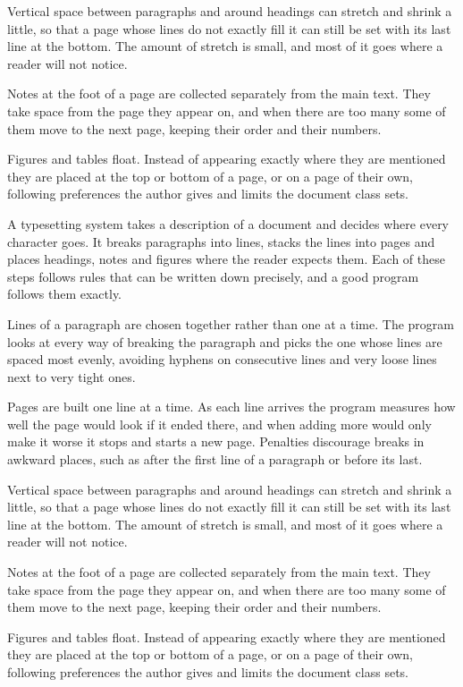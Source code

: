 \documentclass{article}
\begin{document}
Vertical space between paragraphs and around headings can stretch and shrink a little, so that a page whose lines do not exactly fill it can still be set with its last line at the bottom. The amount of stretch is small, and most of it goes where a reader will not notice.

Notes at the foot of a page are collected separately from the main text. They take space from the page they appear on, and when there are too many some of them move to the next page, keeping their order and their numbers.

Figures and tables float. Instead of appearing exactly where they are mentioned they are placed at the top or bottom of a page, or on a page of their own, following preferences the author gives and limits the document class sets.

A typesetting system takes a description of a document and decides where every character goes. It breaks paragraphs into lines, stacks the lines into pages and places headings, notes and figures where the reader expects them. Each of these steps follows rules that can be written down precisely, and a good program follows them exactly.

Lines of a paragraph are chosen together rather than one at a time. The program looks at every way of breaking the paragraph and picks the one whose lines are spaced most evenly, avoiding hyphens on consecutive lines and very loose lines next to very tight ones.

Pages are built one line at a time. As each line arrives the program measures how well the page would look if it ended there, and when adding more would only make it worse it stops and starts a new page. Penalties discourage breaks in awkward places, such as after the first line of a paragraph or before its last.

Vertical space between paragraphs and around headings can stretch and shrink a little, so that a page whose lines do not exactly fill it can still be set with its last line at the bottom. The amount of stretch is small, and most of it goes where a reader will not notice.

Notes at the foot of a page are collected separately from the main text. They take space from the page they appear on, and when there are too many some of them move to the next page, keeping their order and their numbers.

Figures and tables float. Instead of appearing exactly where they are mentioned they are placed at the top or bottom of a page, or on a page of their own, following preferences the author gives and limits the document class sets.
\end{document}
